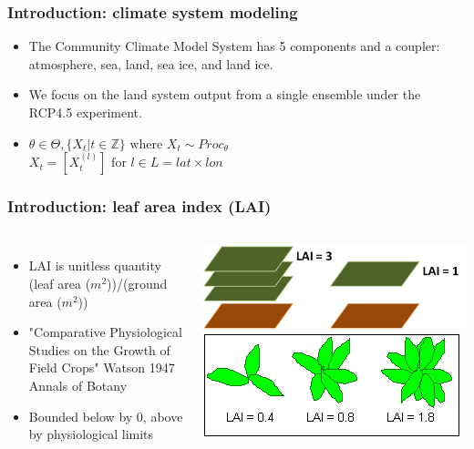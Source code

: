 \documentclass{beamer}
\begin{document}
\begin{frame}
    \frametitle{Introduction: climate system modeling}
    \begin{itemize}
        \item The Community Climate Model System has 5 components and a coupler:
            atmosphere, sea, land, sea ice, and land ice.
        \item We focus on the land system output from a single ensemble under
            the RCP4.5 experiment.

        \item $\theta\in\Theta, \{X_t|t\in\mathbb{Z}\} \textrm{ where }
            X_t\sim Proc_\theta$\\
            $X_t = [X_t^{(l)}] \textrm{ for } l\in L = lat\times lon$
    \end{itemize}
\end{frame}

\begin{frame}
    \frametitle{Introduction: leaf area index (LAI)}
    \begin{columns}

        \column{2in}
            \begin{itemize}
                \item LAI is unitless quantity (leaf area ($m^2$))/(ground area ($m^2$))
                \item "Comparative Physiological Studies on the Growth of Field Crops" Watson 1947 Annals of Botany
                \item Bounded below by 0, above by physiological limits
            \end{itemize}

        \column{3in}
            \includegraphics[width=\columnwidth,height=\textheight,keepaspectratio]{../img/lai.png}\\
            \includegraphics[width=\columnwidth,height=\textheight,keepaspectratio]{../img/lai2.png}

    \end{columns}
\end{frame}
\end{document}
